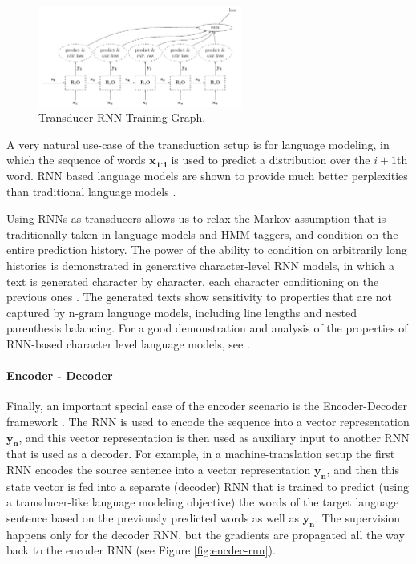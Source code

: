 \documentclass[jair,twoside,11pt,theapa]{article}
\newcommand{\m}[1]{\mathbf{#1}}%
\begin{document}
{\begin{figure}[ht]
    \begin{center}
    \includegraphics[width=0.6\textwidth]{transducer-rnn.pdf} 
    \end{center}
    \caption{Transducer RNN Training Graph.}
    \label{fig:transducer-rnn}
\end{figure}


A very natural use-case of the transduction setup is for
language modeling, in which the sequence of words $\m{x_{1:i}}$ is used to
predict a distribution over the $i+1$th word.  RNN based language models are shown to
provide much better perplexities than traditional language models
\cite{mikolov2010recurrent,sundermeyer2012lstm,mikolov2012statistical}.

Using RNNs as transducers allows us to relax the Markov assumption that is
traditionally taken in language models and HMM taggers, and condition on the
entire prediction history.  The power of the ability to condition on arbitrarily long
histories is demonstrated in generative character-level RNN models, in which
a text is generated character by character, each character conditioning on the
previous ones \cite{sutskever2011generating}.  The generated texts show sensitivity to properties that are not
captured by n-gram language models, including line lengths and nested
parenthesis balancing.  For a good demonstration and analysis of the properties of
RNN-based character level
language models, see \cite{karpathy2015visualizing}.

\paragraph{Encoder - Decoder} Finally, an important special case of the encoder scenario
is the Encoder-Decoder framework \cite{cho2014properties,sutskever2014sequence}.
The RNN is used to encode the sequence
into a vector representation $\m{y_n}$, and this vector representation is then used
as auxiliary input to another RNN that is used as a decoder. For example, in a machine-translation
setup the first RNN encodes the source sentence
into a vector representation $\m{y_n}$, and then this state vector is fed into a separate
(decoder) RNN that is trained to predict (using a transducer-like language modeling objective)
the words of the target language sentence based on the previously predicted
words as well as $\m{y_n}$.
The supervision happens only for the decoder RNN,
but the gradients are propagated all the way back to the encoder RNN (see Figure
\ref{fig:encdec-rnn}).

}
\end{document}
